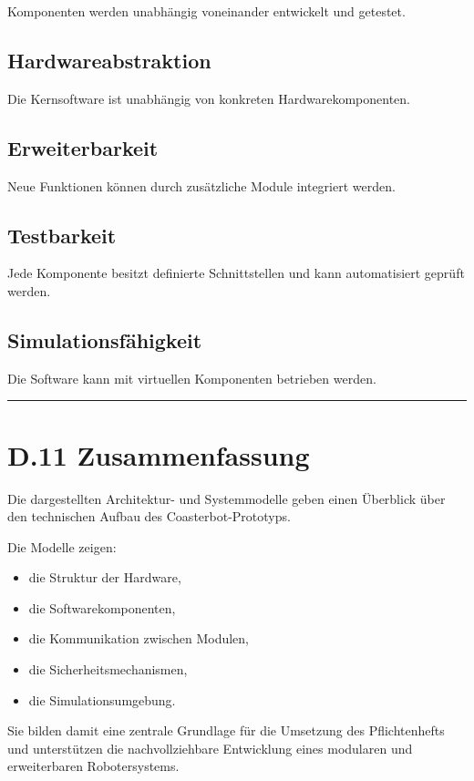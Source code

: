 \documentclass[
  a4paper,
  12pt,
  DIV=12,        %
  parskip=half,  %
  headings=small %
]{scrartcl}
\theoremstyle{definition}
\providecommand{\tightlist}{%
  \setlength{\itemsep}{0pt}\setlength{\parskip}{0pt}}
\theoremstyle{definition}
\providecommand{\tightlist}{%
  \setlength{\itemsep}{0pt}\setlength{\parskip}{0pt}}
\begin{document}
Komponenten werden unabhängig voneinander entwickelt und getestet.

\subsection{Hardwareabstraktion}\label{hardwareabstraktion-1}

Die Kernsoftware ist unabhängig von konkreten Hardwarekomponenten.

\subsection{Erweiterbarkeit}\label{erweiterbarkeit-1}

Neue Funktionen können durch zusätzliche Module integriert werden.

\subsection{Testbarkeit}\label{testbarkeit-1}

Jede Komponente besitzt definierte Schnittstellen und kann automatisiert
geprüft werden.

\subsection{Simulationsfähigkeit}\label{simulationsfuxe4higkeit-1}

Die Software kann mit virtuellen Komponenten betrieben werden.

\begin{center}\rule{0.5\linewidth}{0.5pt}\end{center}

\section{D.11 Zusammenfassung}\label{d.11-zusammenfassung}

Die dargestellten Architektur- und Systemmodelle geben einen Überblick
über den technischen Aufbau des Coasterbot-Prototyps.

Die Modelle zeigen:

\begin{itemize}
\tightlist
\item
  die Struktur der Hardware,
\item
  die Softwarekomponenten,
\item
  die Kommunikation zwischen Modulen,
\item
  die Sicherheitsmechanismen,
\item
  die Simulationsumgebung.
\end{itemize}

Sie bilden damit eine zentrale Grundlage für die Umsetzung des
Pflichtenhefts und unterstützen die nachvollziehbare Entwicklung eines
modularen und erweiterbaren Robotersystems.
\end{document}
